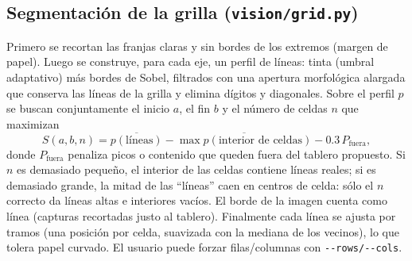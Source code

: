 \documentclass[conference,a4paper]{IEEEtran}
\begin{document}
\subsection{Segmentación de la grilla (\texttt{vision/grid.py})}
Primero se recortan las franjas claras y sin bordes de los extremos (margen de papel). Luego se construye, para cada eje,
un perfil de líneas: tinta (umbral adaptativo) más bordes de Sobel, filtrados con una apertura morfológica alargada que
conserva las líneas de la grilla y elimina dígitos y diagonales. Sobre el perfil $p$ se buscan conjuntamente el inicio $a$,
el fin $b$ y el número de celdas $n$ que maximizan
\begin{equation}
S(a,b,n) = \overline{p(\text{líneas})} - \overline{\max p(\text{interior de celdas})} - 0.3\,P_{\text{fuera}},
\end{equation}
donde $P_{\text{fuera}}$ penaliza picos o contenido que queden fuera del tablero propuesto. Si $n$ es demasiado pequeño,
el interior de las celdas contiene líneas reales; si es demasiado grande, la mitad de las ``líneas'' caen en centros de
celda: sólo el $n$ correcto da líneas altas e interiores vacíos. El borde de la imagen cuenta como línea (capturas
recortadas justo al tablero). Finalmente cada línea se ajusta por tramos (una posición por celda, suavizada con la mediana
de los vecinos), lo que tolera papel curvado. El usuario puede forzar filas/columnas con \texttt{-{}-rows/-{}-cols}.
\end{document}
